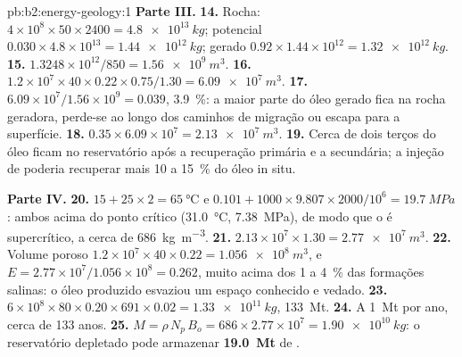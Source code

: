 \begin{solution}{pb:b2:energy-geology:1}
\noindent\textbf{Parte III.}
\textbf{14.} Rocha: $4 \times 10^8 \times 50 \times 2400 = \qty{4.8e13}{kg}$; potencial $0.030
\times 4.8 \times 10^{13} = \qty{1.44e12}{kg}$; gerado $0.92 \times 1.44 \times 10^{12} =
\qty{1.32e12}{kg}$.
\textbf{15.} $1.3248 \times 10^{12}/850 = \qty{1.56e9}{m^3}$.
\textbf{16.} $1.2 \times 10^7 \times 40 \times 0.22 \times 0.75/1.30 = \qty{6.09e7}{m^3}$.
\textbf{17.} $6.09 \times 10^7/1.56 \times 10^9 = 0.039$, \qty{3.9}{\percent}: a maior parte do óleo gerado
fica na rocha geradora, perde-se ao longo dos caminhos de migração ou escapa para a superfície.
\textbf{18.} $0.35 \times 6.09 \times 10^7 = \qty{2.13e7}{m^3}$.
\textbf{19.} Cerca de dois terços do óleo ficam no reservatório após a recuperação primária e a
secundária; a injeção de  poderia recuperar mais 10 a \qty{15}{\percent} do óleo in situ.

\noindent\textbf{Parte IV.}
\textbf{20.} $15 + 25 \times 2 = \qty{65}{\celsius}$ e $0.101 + 1000 \times 9.807 \times 2000/10^6
= \qty{19.7}{MPa}$: ambos acima do ponto crítico (\qty{31.0}{\celsius}, \qty{7.38}{MPa}), de modo que o
 é supercrítico, a cerca de \qty{686}{kg.m^{-3}}.
\textbf{21.} $2.13 \times 10^7 \times 1.30 = \qty{2.77e7}{m^3}$.
\textbf{22.} Volume poroso $1.2 \times 10^7 \times 40 \times 0.22 = \qty{1.056e8}{m^3}$, e $E =
2.77 \times 10^7/1.056 \times 10^8 = 0.262$, muito acima dos 1 a \qty{4}{\percent} das formações
salinas: o óleo produzido esvaziou um espaço conhecido e vedado.
\textbf{23.} $6 \times 10^8 \times 80 \times 0.20 \times 691 \times 0.02 = \qty{1.33e11}{kg}$,
\qty{133}{Mt}.
\textbf{24.} A \qty{1}{Mt} por ano, cerca de 133 anos.
\textbf{25.} $M = \rho\,N_p\,B_o = 686 \times 2.77 \times 10^7 = \qty{1.90e10}{kg}$: o reservatório
depletado pode armazenar \textbf{\qty[text-series-to-math=true]{19.0}{Mt}} de .
\end{solution}
